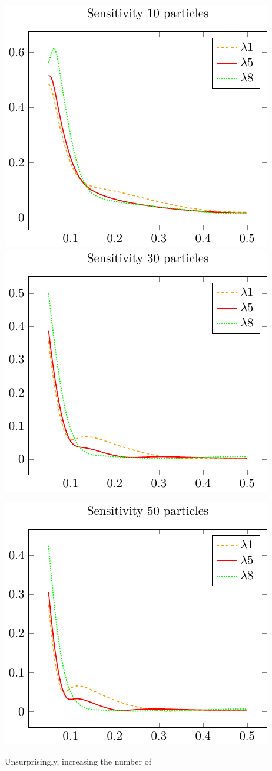 \includegraphics{./gfx/sensitivity_compare10.pdf}
\includegraphics{./gfx/sensitivity_compare30.pdf}

\begin{center}
 \includegraphics{./gfx/sensitivity_compare50.pdf}
\end{center}


Unsurprisingly, increasing the number of 
